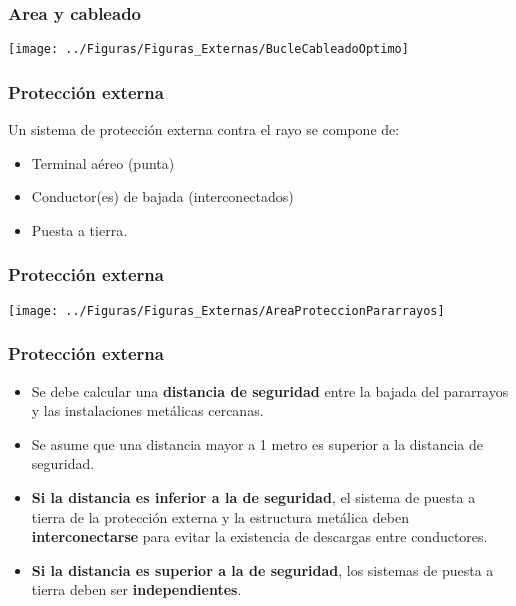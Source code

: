 \documentclass[serif, xcolor=dvipsnames]{beamer}
\begin{document}
\begin{frame}
\frametitle{Area y cableado}

\begin{center}
\texttt{[image: ../Figuras/Figuras\_Externas/BucleCableadoOptimo]}
\par\end{center}


\end{frame}

\begin{frame}
\frametitle{Protección externa}

Un sistema de protección externa contra el rayo se compone de:
\begin{itemize}
\item Terminal aéreo (punta)
\item Conductor(es) de bajada (interconectados)
\item Puesta a tierra.
\end{itemize}

\end{frame}

\begin{frame}
\frametitle{Protección externa}

\begin{center}
\texttt{[image: ../Figuras/Figuras\_Externas/AreaProteccionPararrayos]}
\par\end{center}


\end{frame}

\begin{frame}
\frametitle{Protección externa}
\begin{itemize}
\item Se debe calcular una \textbf{distancia de seguridad} entre la bajada
del pararrayos y las instalaciones metálicas cercanas. 
\item Se asume que una distancia mayor a 1 metro es superior a la distancia
de seguridad.
\item \textbf{Si la distancia es inferior a la de seguridad}, el sistema
de puesta a tierra de la protección externa y la estructura metálica
deben \textbf{interconectarse} para evitar la existencia de descargas
entre conductores.
\item \textbf{Si la distancia es superior a la de seguridad}, los sistemas
de puesta a tierra deben ser \textbf{independientes}.
\end{itemize}

\end{frame}
\end{document}
